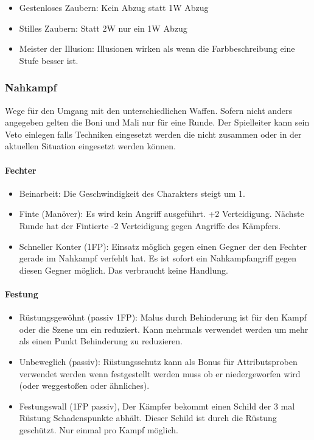 \documentclass{article}
\begin{document}
\begin{itemize}
\item Gestenloses Zaubern: Kein Abzug statt 1W Abzug
\item Stilles Zaubern: Statt 2W nur ein 1W Abzug
\item Meister der Illusion: Illusionen wirken als wenn die Farbbeschreibung eine Stufe besser ist.
\end{itemize}

\subsubsection{Nahkampf}

Wege für den Umgang mit den unterschiedlichen Waffen. Sofern nicht anders angegeben gelten die Boni und Mali nur für
eine Runde. Der Spielleiter kann sein Veto einlegen falls Techniken eingesetzt werden die nicht zusammen oder in der
aktuellen Situation eingesetzt werden können.

\paragraph{Fechter}

\begin{itemize}
\item Beinarbeit: Die Geschwindigkeit des Charakters steigt um 1.
\item Finte (Manöver): Es wird kein Angriff ausgeführt. +2 Verteidigung. Nächste Runde hat der Fintierte -2 Verteidigung gegen Angriffe des Kämpfers.
\item Schneller Konter (1FP): Einsatz möglich gegen einen Gegner der den Fechter gerade im Nahkampf verfehlt hat. Es ist sofort ein Nahkampfangriff gegen diesen Gegner möglich. Das verbraucht keine Handlung.
\end{itemize}

\paragraph{Festung}

\begin{itemize}
\item Rüstungsgewöhnt (passiv 1FP): Malus durch Behinderung ist für den Kampf oder die Szene um ein reduziert. Kann mehrmals verwendet werden um mehr als einen Punkt Behinderung zu reduzieren.
\item Unbeweglich (passiv): Rüstungsschutz kann als Bonus für Attributsproben verwendet werden wenn festgestellt werden muss ob er niedergeworfen wird (oder weggestoßen oder ähnliches).
\item Festungswall (1FP passiv), Der Kämpfer bekommt einen Schild der 3 mal Rüstung Schadenspunkte abhält. Dieser Schild ist durch die Rüstung geschützt. Nur einmal pro Kampf möglich.
\end{itemize}
\end{document}
